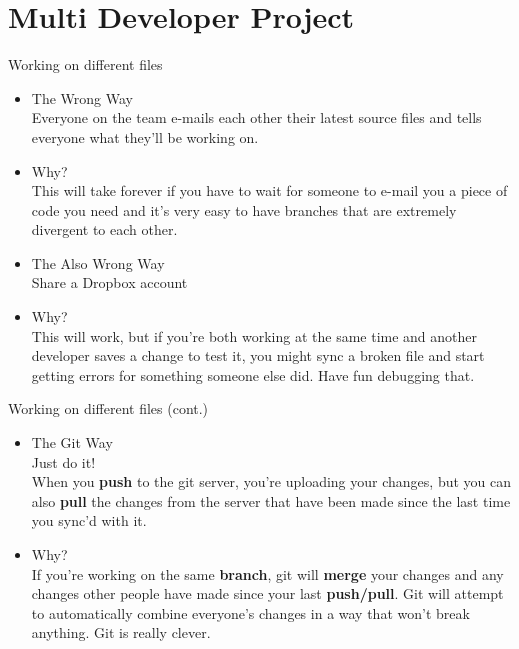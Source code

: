 \documentclass{beamer}
\begin{document}
\section{Multi Developer Project}
\begin{frame}{Working on different files}
\begin{itemize}
\item The Wrong Way\\
        Everyone on the team e-mails each other their latest source files and tells everyone what they'll be working on.
  \pause
  \item Why?\\
        This will take forever if you have to wait for someone to e-mail you a piece of code you need and it's very easy to have branches that are extremely divergent to each other.
  
  \pause
  \item The Also Wrong Way\\
        Share a Dropbox account
  \pause
  \item Why?\\
        This will work, but if you're both working at the same time and another developer saves a change to test it, you might sync a broken file and start getting errors for something someone else did. Have fun debugging that.
  \end{itemize}

\end{frame}


\begin{frame}{Working on different files (cont.)}
\begin{itemize}
\item The Git Way\\
        Just do it!\\
\pause
        When you \textbf{push} to the git server, you're uploading your changes, but you can also \textbf{pull} the changes from the server that have been made since the last time you sync'd with it.
  \pause
  \item Why?\\
        If you're working on the same \textbf{branch}, git will \textbf{merge} your changes and any changes other people have made since your last \textbf{push/pull}. Git will attempt to automatically combine everyone's changes in a way that won't break anything. Git is really clever.
\end{itemize}
\end{frame}
\end{document}
